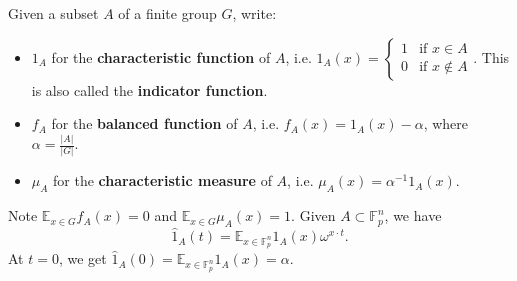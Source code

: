 \documentclass{article}
\theoremstyle{definition}
\begin{document}
Given a subset $A$ of a finite group $G$, write:
\begin{itemize}
    \item $1_A$ for the \textbf{characteristic function} of $A$, i.e. $1_A(x) = \begin{cases}
            1 & \text{if }x \in A\\
            0 & \text{if } x \not\in A
    \end{cases}$. This is also called the \textbf{indicator function}.
    \item $f_A$ for the \textbf{balanced function} of $A$, i.e. $f_A(x) = 1_A(x) - \alpha$, where $\alpha = \frac{|A|}{|G|}$.
    \item $\mu_A$ for the \textbf{characteristic measure} of $A$, i.e. $\mu_A(x) = \alpha^{-1} 1_A(x)$.
\end{itemize}
Note $\mathbb{E}_{x \in G}f_A(x) = 0$ and $\mathbb{E}_{x \in G}\mu_A(x)=1$. Given $A \subset \mathbb{F}_{p}^n$, we have \[
\hat{1}_A(t) = \mathbb{E}_{x \in \mathbb{F}_{p}^n} 1_A(x)\omega^{x \cdot t}.
\]
At $t=0$, we get $\hat{1}_A(0) = \mathbb{E}_{x \in \mathbb{F}_{p}^n}1_A(x) = \alpha$.
\vspace{1mm}
 
\end{document}
